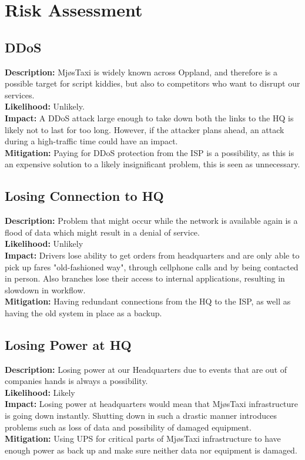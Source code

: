 \chapter{Risk Assessment}
\label{chap:riskAssesment}


\section{DDoS}
\textbf{Description:} MjøsTaxi is widely known across Oppland, and therefore is a possible target for script kiddies, but also to competitors who want to disrupt our services.  \\
\textbf{Likelihood:} Unlikely. \\
\textbf{Impact:} A DDoS attack large enough to take down both the links to the HQ is likely not to last for too long. However, if the attacker plans ahead, an attack during a high-traffic time could have an impact. \\
\textbf{Mitigation:} Paying for DDoS protection from the ISP is a possibility, as this is an expensive solution to a likely insignificant problem, this is seen as unnecessary.

\section{Losing Connection to HQ}
\textbf{Description:} Problem that might occur while the network is available again is a flood of data which might result in a denial of service. \\
\textbf{Likelihood:} Unlikely\\
\textbf{Impact:} Drivers lose ability to get orders from headquarters and are only able to pick up fares "old-fashioned way", through cellphone calls and by being contacted in person. Also branches lose their access to internal applications, resulting in slowdown in workflow. \\
\textbf{Mitigation:} Having redundant connections from the HQ to the ISP, as well as having the old system in place as a backup.

\section{Losing Power at HQ}
\textbf{Description:} Losing power at our Headquarters due to events that are out of companies hands is always a possibility.  \\
\textbf{Likelihood:} Likely \\
\textbf{Impact:} Losing power at headquarters would mean that MjøsTaxi infrastructure is going down instantly. Shutting down in such a drastic manner introduces problems such as loss of data and possibility of damaged equipment.\\
\textbf{Mitigation:} Using UPS for critical parts of MjøsTaxi infrastructure to have enough power as back up and make sure neither data nor equipment is damaged. \cite{poweroutage}

